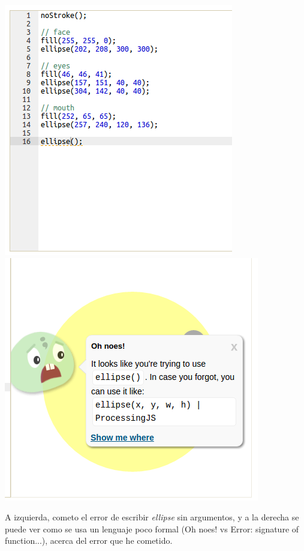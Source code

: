\documentclass{report}
\begin{document}
	\begin{center}
	\includegraphics[width=0.45\linewidth]{khanerror}
	\includegraphics[width=0.45\linewidth]{khanerror2}
	
	A izquierda, cometo el error de escribir \textit{ellipse} sin argumentos, y a la derecha se puede ver como se usa un lenguaje poco formal (Oh noes! vs Error: signature of function...), acerca del error que he cometido.
	\end{center}
	
\end{document}
